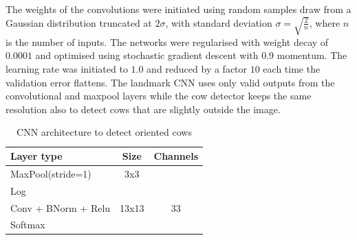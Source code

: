 \documentclass{IET}
\begin{document}
The weights of the convolutions were initiated using random samples draw from a Gaussian
distribution truncated at $2\sigma$, with standard deviation $\sigma=\sqrt{\frac{2}{n}}$,
where $n$ is the number of inputs\cite{DBLP:journals/corr/HeZR015}. The networks were regularised with weight decay of
$0.0001$ and optimised using stochastic gradient descent with $0.9$ momentum. The
learning rate was initiated to $1.0$ and reduced by a factor $10$ each time the validation
error flattens. The landmark CNN uses only valid outputs from the convolutional and maxpool
layers while the cow detector keeps the same resolution also to detect cows that are
slightly outside the image.

\begin{table}
\begin{center}
\begin{tabular}{|l|c|c|}
\hline
\textbf{Layer type} & \textbf{Size} & \textbf{Channels} \\
\hline

MaxPool(stride=1) & 3x3 &  \\
Log & & \\
Conv + BNorm + Relu & 13x13 & 33 \\
Softmax & & \\
\hline
\end{tabular}
\end{center}
\caption{CNN architecture to detect oriented cows
}
\label{tab:cowdirnet}
\end{table}
\end{document}
